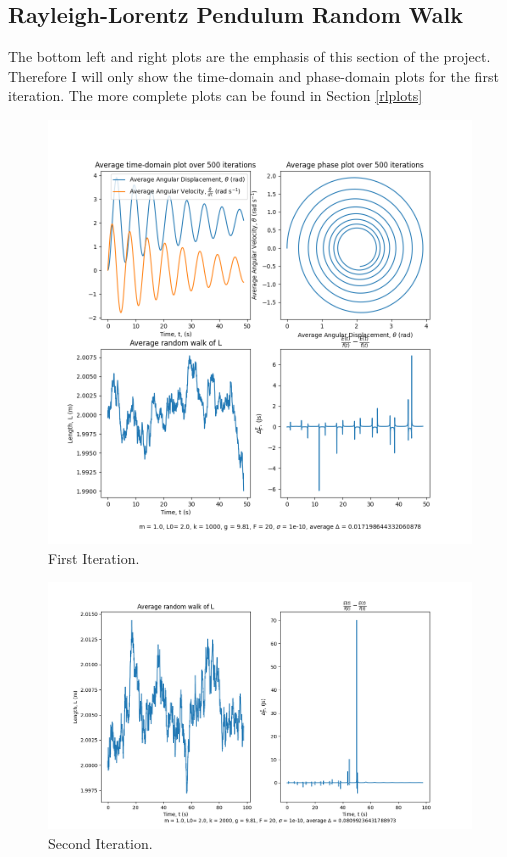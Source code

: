\documentclass[10pt, twocolumn]{article}
\begin{document}
\subsection{Rayleigh-Lorentz Pendulum Random Walk}{\label{rlresults}}
The bottom left and right plots are the emphasis of this section of the project. Therefore I will only show the time-domain and phase-domain plots for the first iteration. The more complete plots can be found in Section \ref{rlplots}
\begin{figure}
    \centering
    \includegraphics[width = \columnwidth]{Projects/ForcedSimplePendulum/Plots/m = 1.0, L0= 2.0, k = 1000, g = 9.81, F = 20, sigma = 1e-10, run number 0.png}
    \caption{First Iteration.}
    \label{fig:enter-label}
\end{figure}

\begin{figure}
    \centering
    \includegraphics[width = \columnwidth]{Projects/ForcedSimplePendulum/Plots/simplified m = 1.0, L0= 2.0, k = 2000, g = 9.81, F = 20, sigma = 1e-10, run number 1.png}
    \caption{Second Iteration.}
    \label{fig:enter-label}
\end{figure}
\end{document}
